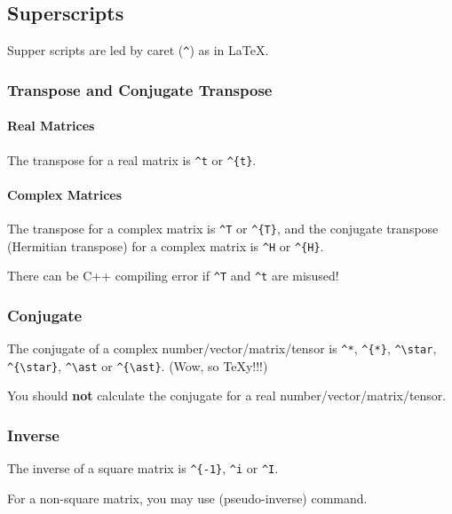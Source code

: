 \subsection{Superscripts}\label{d:subsec:CALC_super}
Supper scripts are led by caret (\verb`^`\indextt{\^{}}) as in \LaTeX{}.
\subsubsection{Transpose and Conjugate Transpose}
\paragraph{Real Matrices}
The transpose for a real matrix is \verb`^t` or \verb`^{t}`.
\paragraph{Complex Matrices}
The transpose for a complex matrix is \verb`^T` or \verb`^{T}`,
and the conjugate transpose (Hermitian transpose)
for a complex matrix is \verb`^H` or \verb`^{H}`.
\begin{warning}
  There can be C++ compiling error if \verb`^T` and \verb`^t` are misused!
\end{warning}
\subsubsection{Conjugate}
The conjugate of a complex number/vector/matrix/tensor is
\verb`^*`\indextt{\^{}*},
\verb`^{*}`\indextt{\^{}\{*\}},
\verb`^\star`,
\verb`^{\star}`,
\verb`^\ast` or
\verb`^{\ast}`.
(Wow, so \TeX y!!!)
\begin{warning}
  You should \textbf{not} calculate the conjugate for a real number/vector/matrix/tensor.
\end{warning}
\subsubsection{Inverse}
The inverse of a square matrix is
\verb`^{-1}`,
\verb`^i` or
\verb`^I`.

For a non-square matrix, you may use
\ALG{\pinv} (pseudo-inverse) command.

